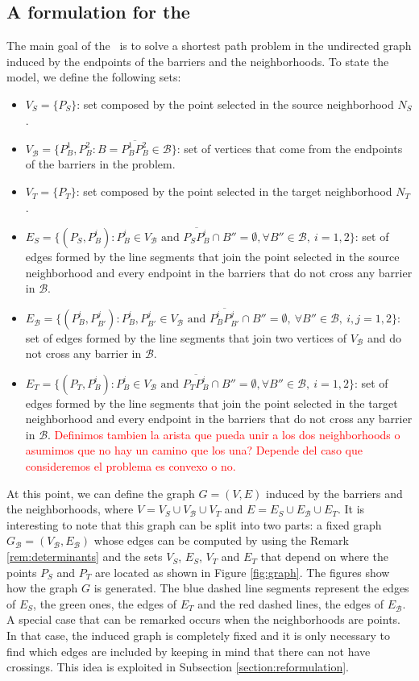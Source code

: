 \documentclass[a4paper]{elsarticle}
\newcommand{\SPPN}{{\sf{H-SPPN}\xspace }}
\newcommand{\B}{{\mathcal B}}
\newcommand{\VB}{{V^{}_{\mathcal B}}}
\newcommand{\EB}{{E^{}_{\mathcal B}}}
\newcommand{\VS}{{V^{}_{S}}}
\newcommand{\ES}{{E^{}_{S}}}
\newcommand{\VT}{{V^{}_{T}}}
\newcommand{\ET}{{E^{}_{T}}}
\begin{document}
\subsection{A formulation for the \SPPN}
The main goal of the \SPPN\  is to solve a shortest path problem in the undirected graph induced by the endpoints of the barriers and the neighborhoods. To state the model,  we define the following sets:
\begin{itemize}
\item $\VS=\{P_S\}$: set composed by the point selected in the source neighborhood $N_S$.
\item $\VB=\{P^1_B, P^2_B:B=\overline{P^1_B P^2_B}\in \mathcal B\}$: set of vertices that come from the endpoints of the barriers in the problem.
\item $\VT=\{P^{}_T\}$: set composed by the point selected in the target neighborhood $N_T$.
\item $\ES=\{(P_S, P^i_{B}):P^i_B\in V_\B\text{ and } \overline{P_SP^i_B}\cap B''=\emptyset,\forall B''\in\B,\:i=1,2\}$: set of edges formed by the line segments that join the point selected in the source neighborhood and every endpoint in the barriers that do not cross any barrier in $\B$.
\item $\EB=\{(P^{i}_B, P^{j}_{B'}):P^i_B, P^j_{B'}\in \VB \text{ and } \overline{P^i_B P^j_{B'}}\cap B''=\emptyset,\:\forall B''\in\mathcal B,\:i, j=1,2\}$: set of edges formed by the line segments that join two vertices of $V_{\mathcal B}$ and do not cross any barrier in $\B$.
\item $\ET=\{(P^{}_T, P^i_{B}):P^i_B\in V_\B\text{ and } \overline{P^{}_TP^i_B}\cap B''=\emptyset,\forall B''\in\B,\:i=1,2\}$: set of edges formed by the line segments that join the point selected in the target neighborhood and every endpoint in the barriers that do not cross any barrier in $\B$.
\textcolor{red}{Definimos tambien la arista que pueda unir a los dos neighborhoods o asumimos que no hay un camino que los una? Depende del caso que consideremos el problema es convexo o no.}
\end{itemize} 

At this point, we can define the graph $G= (V, E)$ induced by the barriers and the neighborhoods, where $V=\VS\cup \VB\cup\VT$ and $E=\ES\cup\EB \cup\ET$. It is interesting to note that this graph can be split into two parts: a fixed graph $G_\B=(\VB,\EB)$ whose edges can be computed by using the Remark \ref{rem:determinants} and the sets $\VS$, $\ES$, $\VT$ and $\ET$ that depend on where the points $P_S$ and $P^{}_T$ are located as shown in Figure \ref{fig:graph}.  The figures show how the graph $G$ is generated. The blue dashed line segments represent the edges of $\ES$, the green ones, the edges of $\ET$ and the red dashed lines, the edges of $\EB$. A special case that can be remarked occurs when the neighborhoods are points. In that case, the induced graph is completely fixed and it is only necessary to find which edges are included by keeping in mind that there can not have crossings. This idea is exploited in Subsection \ref{section:reformulation}.
\end{document}
